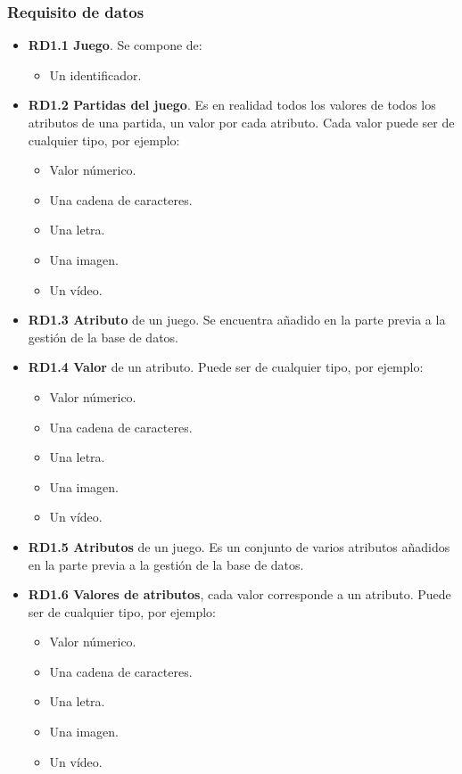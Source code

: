 \subsubsection{Requisito de datos}

\begin{itemize}
	\item \textbf{RD1.1 Juego}. Se compone de:
	\begin{itemize}
		\item Un identificador.
	\end{itemize}
	
	\item \textbf{RD1.2 Partidas del juego}. Es en realidad todos los valores de todos los atributos de una partida, un valor por cada atributo. Cada valor puede ser de cualquier tipo, por ejemplo:
	\begin{itemize}
		\item Valor númerico.
		\item Una cadena de caracteres.
		\item Una letra.
		\item Una imagen.
		\item Un vídeo.
	\end{itemize}
	
	\item \textbf{RD1.3 Atributo} de un juego. Se encuentra añadido en la parte previa a la gestión de la base de datos.
	
	\item \textbf{RD1.4 Valor} de un atributo. Puede ser de cualquier tipo, por ejemplo:
	\begin{itemize}
		\item Valor númerico.
		\item Una cadena de caracteres.
		\item Una letra.
		\item Una imagen.
		\item Un vídeo.
	\end{itemize}
	
	\item \textbf{RD1.5 Atributos} de un juego. Es un conjunto de varios atributos añadidos en la parte previa a la gestión de la base de datos.
	
	\item \textbf{RD1.6 Valores de atributos}, cada valor corresponde a un atributo. Puede ser de cualquier tipo, por ejemplo:
	\begin{itemize}
		\item Valor númerico.
		\item Una cadena de caracteres.
		\item Una letra.
		\item Una imagen.
		\item Un vídeo.
	\end{itemize}
	

\end{itemize}
